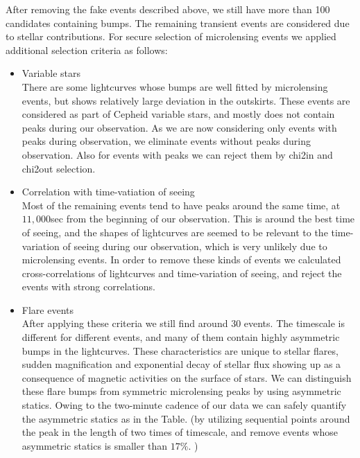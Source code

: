 \documentclass[iop, apj]{emulateapj}
\newcommand{\?}{\stackrel{?}{=}}
\begin{document}


After removing the fake events described above, we still have 
more than 100 candidates containing bumps. 
The remaining transient events are considered due to stellar contributions. 
For secure selection of microlensing events we applied additional selection criteria as follows: 

\begin{itemize}

\item{Variable stars}\\%
There are some lightcurves whose bumps are well fitted by microlensing events, but 
shows relatively large deviation in the outskirts. 
These events are considered as part of Cepheid variable stars, and mostly 
does not contain peaks during our observation. 
As we are now considering only events with peaks during observation, we eliminate events 
without peaks during observation. 
Also for events with peaks we can reject them by chi2in and chi2out selection. 


\item{Correlation with time-vatiation of seeing}\\
Most of the remaining events tend to have peaks around the same time, at $11,000$sec 
from the beginning of our observation. 
This is around the best time of seeing, and the shapes of lightcurves are seemed to be 
relevant to the time-variation of seeing during our observation, which is very 
unlikely due to microlensing events. 
In order to remove these kinds of events we calculated cross-correlations of 
lightcurves and time-variation of seeing, and reject the events with strong correlations. 

\item{Flare events}\\
After applying these criteria we still find around 30 events. 
The timescale is different for different events, and 
many of them contain highly asymmetric bumps in the lightcurves. 
These characteristics are unique to stellar flares, sudden magnification and 
exponential decay of stellar flux showing up as a consequence of 
magnetic activities on the surface of stars. 
We can distinguish these flare bumps from symmetric microlensing peaks 
by using asymmetric statics. 
Owing to the two-minute cadence of our data we can safely quantify the 
asymmetric statics as in the Table. 
(by utilizing sequential points around the peak in the length of 
two times of timescale, and remove events whose asymmetric statics is smaller than 
$17\%$. )



\end{itemize}
\end{document}
